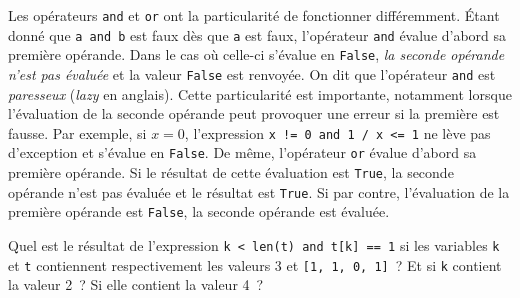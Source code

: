 \documentclass{magnolia}
\begin{document}
Les opérateurs \verb_and_ et \verb_or_ ont la particularité de fonctionner
différemment. Étant donné que \verb_a and b_ est faux dès que \verb_a_ est faux,
l'opérateur \verb_and_ évalue d'abord sa première opérande. Dans le cas où celle-ci
s'évalue en \verb_False_, \emph{la seconde opérande n'est pas évaluée} et la valeur \verb_False_
est renvoyée. On dit que l'opérateur \verb_and_ est \emph{paresseux} (\emph{lazy} en
anglais). Cette particularité est importante, notamment lorsque l'évaluation de la seconde
opérande peut provoquer une erreur si la première est fausse. Par exemple, si $x=0$, l'expression
\verb_x != 0 and 1 / x <= 1_ ne lève pas d'exception et s'évalue en \verb_False_.
De même, l'opérateur \verb_or_ évalue d'abord sa première opérande. Si le résultat
de cette évaluation est \verb_True_, la seconde opérande n'est pas évaluée et le
résultat est \verb_True_. Si par contre, l'évaluation de la
première opérande est \verb_False_, la seconde opérande est évaluée.
\vspace{2ex}
\begin{exoUnique}
\exo Quel est le résultat de l'expression \verb_k < len(t) and t[k] == 1_
  si les variables \verb_k_ et \verb_t_ contiennent respectivement les valeurs
	3 et \verb_[1, 1, 0, 1]_~? Et si \verb_k_ contient la valeur 2~? Si elle contient la
	valeur 4~?
\end{exoUnique}







\end{document}
